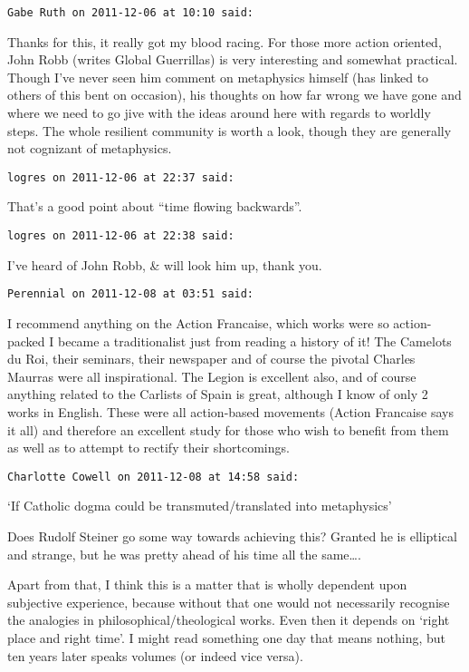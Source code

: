 \begin{footnotesize}
\begin{sffamily}
\hfill

\texttt{Gabe Ruth on 2011-12-06 at 10:10 said: }

Thanks for this, it really got my blood racing. For those more action oriented, John Robb (writes Global Guerrillas) is very interesting and somewhat practical. Though I've never seen him comment on metaphysics himself (has linked to others of this bent on occasion), his thoughts on how far wrong we have gone and where we need to go jive with the ideas around here with regards to worldly steps. The whole resilient community is worth a look, though they are generally not cognizant of metaphysics.


\hfill

\texttt{logres on 2011-12-06 at 22:37 said: }

That's a good point about ``time flowing backwards''.


\hfill

\texttt{logres on 2011-12-06 at 22:38 said: }

I've heard of John Robb, \& will look him up, thank you.


\hfill

\texttt{Perennial on 2011-12-08 at 03:51 said: }

I recommend anything on the Action Francaise, which works were so action-packed I became a traditionalist just from reading a history of it! The Camelots du Roi, their seminars, their newspaper and of course the pivotal Charles Maurras were all inspirational. The Legion is excellent also, and of course anything related to the Carlists of Spain is great, although I know of only 2 works in English. These were all action-based movements (Action Francaise says it all) and therefore an excellent study for those who wish to benefit from them as well as to attempt to rectify their shortcomings.


\hfill

\texttt{Charlotte Cowell on 2011-12-08 at 14:58 said: }

`If Catholic dogma could be transmuted/translated into metaphysics'

Does Rudolf Steiner go some way towards achieving this? Granted he is elliptical and strange, but he was pretty ahead of his time all the same….

Apart from that, I think this is a matter that is wholly dependent upon subjective experience, because without that one would not necessarily recognise the analogies in philosophical/theological works. Even then it depends on `right place and right time'. I might read something one day that means nothing, but ten years later speaks volumes (or indeed vice versa). 


\end{sffamily}
\end{footnotesize}
